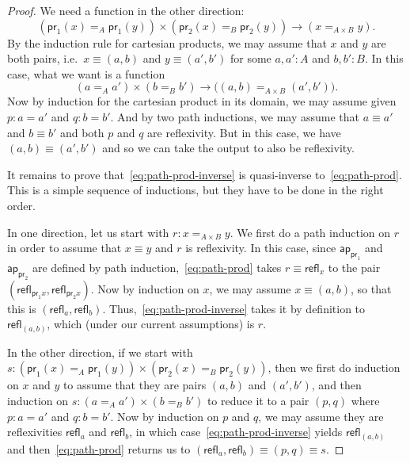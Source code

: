 \documentclass[10pt,a4paper]{article}
\newcommand{\jdeq}{\equiv}      %
\newcommand{\proj}[1]{\ensuremath{\mathsf{pr}_{#1}}\xspace}
\newcommand{\id}[3][]{\ensuremath{#2 =_{#1} #3}\xspace}
\newcommand{\refl}[1]{\ensuremath{\mathsf{refl}_{#1}}\xspace}
\newcommand{\mapfunc}[1]{\ensuremath{\mathsf{ap}_{#1}}\xspace} %
\let\apfunc\mapfunc
\theoremstyle{definition}
\theoremstyle{remark}
\numberwithin{equation}{section}
\begin{document}
\begin{proof}
  We need a function in the other direction:
  \begin{equation}
    (\id[A]{\proj1(x)}{\proj1(y)}) \times (\id[B]{\proj2(x)}{\proj2(y)}) \to (\id[A\times B]{x}{y}). \label{eq:path-prod-inverse}
  \end{equation}
  By the induction rule for cartesian products, we may assume that $x$ and $y$ are both pairs, i.e.\ $x\jdeq (a,b)$ and $y\jdeq (a',b')$ for some $a,a':A$ and $b,b':B$.
  In this case, what we want is a function
  \begin{equation*}
    (\id[A]{a}{a'}) \times (\id[B]{b}{b'}) \to \big(\id[A\times B]{(a,b)}{(a',b')}\big).
  \end{equation*}
  Now by induction for the cartesian product in its domain, we may assume given $p:a=a'$ and $q:b=b'$.
  And by two path inductions, we may assume that $a\jdeq a'$ and $b\jdeq b'$ and both $p$ and $q$ are reflexivity.
  But in this case, we have $(a,b)\jdeq(a',b')$ and so we can take the output to also be reflexivity.

  It remains to prove that~\eqref{eq:path-prod-inverse} is quasi-inverse to~\eqref{eq:path-prod}.
  This is a simple sequence of inductions, but they have to be done in the right order.

  In one direction, let us start with $r:\id[A\times B]{x}{y}$.
  We first do a path induction on $r$ in order to assume that $x\jdeq y$ and $r$ is reflexivity.
  In this case, since $\apfunc{\proj1}$ and $\apfunc{\proj2}$ are defined by path induction,~\eqref{eq:path-prod} takes $r\jdeq \refl{x}$ to the pair $(\refl{\proj1x},\refl{\proj2x})$.
  Now by induction on $x$, we may assume $x\jdeq (a,b)$, so that this is $(\refl a, \refl b)$.
  Thus,~\eqref{eq:path-prod-inverse} takes it by definition to $\refl{(a,b)}$, which (under our current assumptions) is $r$.

  In the other direction, if we start with $s:(\id[A]{\proj1(x)}{\proj1(y)}) \times (\id[B]{\proj2(x)}{\proj2(y)})$, then we first do induction on $x$ and $y$ to assume that they are pairs $(a,b)$ and $(a',b')$, and then induction on $s:(\id[A]{a}{a'}) \times (\id[B]{b}{b'})$ to reduce it to a pair $(p,q)$ where $p:a=a'$ and $q:b=b'$.
  Now by induction on $p$ and $q$, we may assume they are reflexivities $\refl a$ and $\refl b$, in which case~\eqref{eq:path-prod-inverse} yields $\refl{(a,b)}$ and then~\eqref{eq:path-prod} returns us to $(\refl a,\refl b)\jdeq (p,q)\jdeq s$.
\end{proof}
\end{document}
